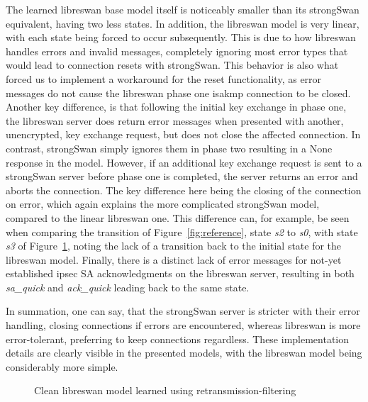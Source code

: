 The learned libreswan base model itself is noticeably smaller than its strongSwan equivalent, having two less states. In addition, the libreswan model is very linear, with each state being forced to occur subsequently. This is due to how libreswan handles errors and invalid messages, completely ignoring most error types that would lead to connection resets with strongSwan. This behavior is also what forced us to implement a workaround for the reset functionality, as error messages do not cause the libreswan phase one \ac{isakmp} connection to be closed. Another key difference, is that following the initial key exchange in phase one, the libreswan server does return error messages when presented with another, unencrypted, key exchange request, but does not close the affected connection. In contrast, strongSwan simply ignores them in phase two resulting in a None response in the model. However, if an additional key exchange request is sent to a strongSwan server before phase one is completed, the server returns an error and aborts the connection. The key difference here being the closing of the connection on error, which again explains the more complicated strongSwan model, compared to the linear libreswan one. This difference can, for example, be seen when comparing the transition of Figure~\ref{fig:reference}, state \emph{s2} to \emph{s0}, with state \emph{s3} of Figure~\ref{fig:learnedmodellibresimple}, noting the lack of a transition back to the initial state for the libreswan model. Finally, there is a distinct lack of error messages for not-yet established \ac{ipsec} SA acknowledgments on the libreswan server, resulting in both \emph{sa\_quick} and \emph{ack\_quick} leading back to the same state. 

In summation, one can say, that the strongSwan server is stricter with their error handling, closing connections if errors are encountered, whereas libreswan is more error-tolerant, preferring to keep connections regardless. These implementation details are clearly visible in the presented models, with the libreswan model being considerably more simple.

\begin{figure}
	\vspace*{\fill}
	\noindent
	\hspace*{-2\oddsidemargin}%
	\caption{Clean libreswan model learned using retransmission-filtering}
	\label{fig:learnedmodellibresimple}
	\vspace*{\fill}
\end{figure}

